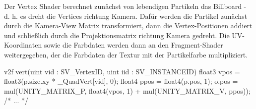 Der Vertex Shader berechnet zunächst von lebendigen Partikeln das Billboard - d. h. es dreht die Vertices richtung Kamera. Dafür werden die Partikel zunächst durch die Kamera-View Matrix transformiert, dann die Vertex-Positionen addiert und schlie{\ss}lich durch die Projektionsmatrix richtung Kamera gedreht. Die UV-Koordinaten sowie die Farbdaten werden dann an den Fragment-Shader weitergegeben, der die Farbdaten der Textur mit der Partikelfarbe multipliziert.

\begin{hlsl}[caption=Unlit Billboard Vertex Shader]
v2f vert(uint vid : SV_VertexID, uint iid : SV_INSTANCEID)
{
    float3 vpos = float3(p.size.xy * _QuadVert[vid], 0);
    float4 ppos = float4(p.pos, 1);
    o.pos = mul(UNITY_MATRIX_P, float4(vpos, 1) + mul(UNITY_MATRIX_V, ppos));
    /* ... */
}
\end{hlsl}

